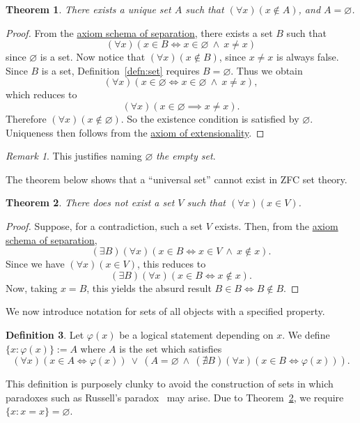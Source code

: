\documentclass[a4paper,11pt]{article}
\theoremstyle{plain}
\newtheorem{thm}{Theorem}[subsection]
\theoremstyle{definition}
\newtheorem{defn}[thm]{Definition}
\theoremstyle{remark}
\newtheorem*{rem}{Remark}
\begin{document}
\begin{thm}
\label{thm:EmptySetIsEmpty}
There exists a unique set $A$ such that $(\forall x)(x \notin A)$, and $A = \varnothing$.
\end{thm}
\begin{proof}
From the \hyperref[axiom:separation]{axiom schema of separation}, there exists a set $B$ such that
\[(\forall x)(x\in B \iff x \in \varnothing \ \land \ x \neq x)\]
since $\varnothing$ is a set. Now notice that $(\forall x)(x \notin B)$, since $x \neq x$ is always false. Since $B$ is a set, Definition~\ref{defn:set} requires $B = \varnothing$. Thus we obtain 
\[(\forall x)(x \in \varnothing \iff x \in \varnothing \ \land \ x \neq x),\]
which reduces to
\[(\forall x)(x \in \varnothing \implies x \neq x).\]
Therefore $(\forall x)(x \notin \varnothing)$. So the existence condition is satisfied by $\varnothing$. Uniqueness then follows from the \hyperref[axiom:extensionality]{axiom of extensionality}.
\end{proof}
\begin{rem}
This justifies naming $\varnothing$ \textit{the empty set}.
\end{rem}

The theorem below shows that a ``universal set'' cannot exist in ZFC set theory.
\begin{thm}
\label{thm:RussellsParadox}
There does not exist a set $V$ such that $(\forall x)(x \in V)$.
\end{thm}
\begin{proof}
Suppose, for a contradiction, such a set $V$ exists. Then, from the \hyperref[axiom:separation]{axiom schema of separation},
\[(\exists B)(\forall x)(x\in B \iff x \in V \ \land \ x \notin x).\]
Since we have $(\forall x)(x \in V)$, this reduces to
\[(\exists B)(\forall x)(x\in B \iff x \notin x).\]
Now, taking $x = B$, this yields the absurd result $B \in B \iff B \notin B$.
\end{proof}

We now introduce notation for sets of all objects with a specified property.
\begin{defn}
\label{defn:class1}
Let $\varphi(x)$ be a logical statement depending on $x$. We define $\{x:\varphi(x)\} := A$ where $A$ is the set which satisfies
\[(\forall x)(x \in A \iff \varphi(x))\ \lor\ (A = \varnothing \ \land \ (\nexists B)(\forall x)(x \in B \iff \varphi(x))).\]
\end{defn}
This definition is purposely clunky to avoid the construction of sets in which paradoxes such as Russell's paradox~\citep{RussellPrinciples} may arise. Due to Theorem~\ref{thm:RussellsParadox}, we require $\{x : x=x\} = \varnothing$. 
\end{document}
